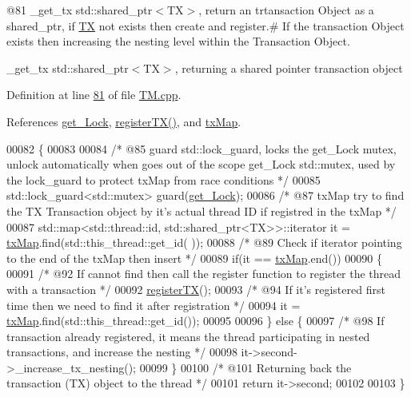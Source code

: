 @81 \+\_\+get\+\_\+tx std\+::shared\+\_\+ptr$<$\+T\+X$>$, return an trtansaction Object as a shared\+\_\+ptr, if \hyperlink{class_t_x}{TX} not exists then create and register.\# If the transaction Object exists then increasing the nesting level within the Transaction Object. 

\+\_\+get\+\_\+tx std\+::shared\+\_\+ptr$<$\+T\+X$>$, returning a shared pointer transaction object 

Definition at line \hyperlink{_t_m_8cpp_source_l00081}{81} of file \hyperlink{_t_m_8cpp_source}{T\+M.\+cpp}.



References \hyperlink{_t_m_8h_source_l00111}{get\+\_\+\+Lock}, \hyperlink{_t_m_8cpp_source_l00045}{register\+T\+X()}, and \hyperlink{_t_m_8h_source_l00091}{tx\+Map}.


\begin{DoxyCode}
00082 \{
00083    
00084     \textcolor{comment}{/* @85 guard std::lock\_guard, locks the get\_Lock mutex, unlock automatically when goes out of the scope
       get\_Lock std::mutex, used by the lock\_guard to protect txMap from race conditions */}
00085     std::lock\_guard<std::mutex> guard(\hyperlink{class_t_m_a123bc5aa0766a7b909bebc54a429e5b0_a123bc5aa0766a7b909bebc54a429e5b0}{get\_Lock});
00086     \textcolor{comment}{/* @87 txMap try to find the TX Transaction object by it's actual thread ID if registred in the txMap 
      */}
00087     std::map<std::thread::id, std::shared\_ptr<TX>>::iterator it = \hyperlink{class_t_m_a0333dfa193ea99d7626de74a2b932e9b_a0333dfa193ea99d7626de74a2b932e9b}{txMap}.find(std::this\_thread::get\_id(
      ));
00088     \textcolor{comment}{/* @89 Check if iterator pointing to the end of the txMap then insert */}
00089     \textcolor{keywordflow}{if}(it == \hyperlink{class_t_m_a0333dfa193ea99d7626de74a2b932e9b_a0333dfa193ea99d7626de74a2b932e9b}{txMap}.end())
00090     \{
00091       \textcolor{comment}{/* @92 If cannot find then call the register function to register the thread with a transaction */}
00092        \hyperlink{class_t_m_a26ea481c24d9aa3aebd6dafb7253376e_a26ea481c24d9aa3aebd6dafb7253376e}{registerTX}();
00093        \textcolor{comment}{/* @94 If it's registered first time then we need to find it after registration */}
00094        it = \hyperlink{class_t_m_a0333dfa193ea99d7626de74a2b932e9b_a0333dfa193ea99d7626de74a2b932e9b}{txMap}.find(std::this\_thread::get\_id());
00095        
00096     \} \textcolor{keywordflow}{else} \{
00097         \textcolor{comment}{/* @98 If transaction already registered, it means the thread participating in nested transactions,
       and increase the nesting */}
00098         it->second->\_increase\_tx\_nesting();
00099     \}
00100     \textcolor{comment}{/* @101 Returning back the transaction (TX) object to the thread */}
00101     \textcolor{keywordflow}{return} it->second;
00102 
00103 \}
\end{DoxyCode}



